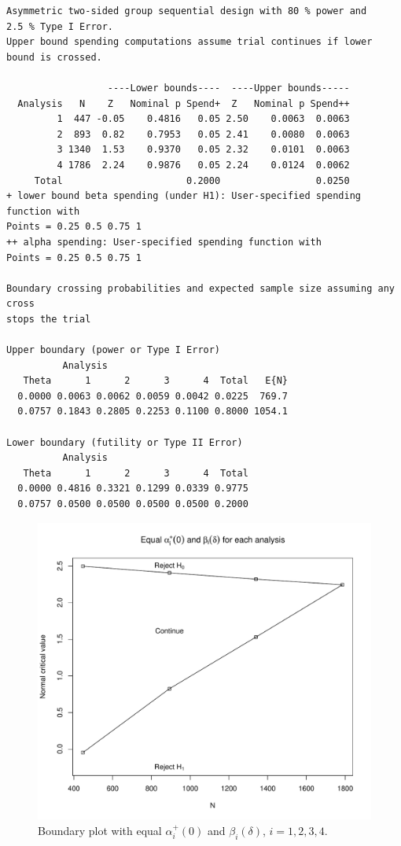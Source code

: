 \begin{verbatim}
Asymmetric two-sided group sequential design with 80 % power and 
2.5 % Type I Error.
Upper bound spending computations assume trial continues if lower 
bound is crossed.

                  ----Lower bounds----  ----Upper bounds-----
  Analysis   N    Z   Nominal p Spend+  Z   Nominal p Spend++
         1  447 -0.05    0.4816   0.05 2.50    0.0063  0.0063
         2  893  0.82    0.7953   0.05 2.41    0.0080  0.0063
         3 1340  1.53    0.9370   0.05 2.32    0.0101  0.0063
         4 1786  2.24    0.9876   0.05 2.24    0.0124  0.0062
     Total                      0.2000                 0.0250 
+ lower bound beta spending (under H1): User-specified spending function with 
Points = 0.25 0.5 0.75 1
++ alpha spending: User-specified spending function with 
Points = 0.25 0.5 0.75 1

Boundary crossing probabilities and expected sample size assuming any cross 
stops the trial

Upper boundary (power or Type I Error)
          Analysis
   Theta      1      2      3      4  Total   E{N}
  0.0000 0.0063 0.0062 0.0059 0.0042 0.0225  769.7
  0.0757 0.1843 0.2805 0.2253 0.1100 0.8000 1054.1

Lower boundary (futility or Type II Error)
          Analysis
   Theta      1      2      3      4  Total
  0.0000 0.4816 0.3321 0.1299 0.0339 0.9775
  0.0757 0.0500 0.0500 0.0500 0.0500 0.2000
\end{verbatim}

\begin{figure}
\begin{center}
\includegraphics[width=.6\textwidth]{figs/boundplot2.pdf}
\end{center}
\caption{Boundary plot with equal $\alpha_i^+(0)$ and $\beta_i(\delta)$, $i=1, 2,3,4$.\label{fig:sfPoints}}
\end{figure}

